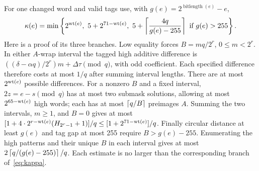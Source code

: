 For one changed word and valid tags use, with $g(e)=2^{\operatorname{bitlength}(e)}-e$,
\begin{equation}\label{eq:kappa}
 \kappa(e)=\min\left\{2^{\operatorname{wt}(e)},\ 5+2^{71-\operatorname{wt}(e)},\
 5+\left\lceil\frac{4q}{g(e)-255}\right\rceil\ \text{if }g(e)>255\right\}.
\end{equation}
Here is a proof of its three branches\cite{enhprior}. Low equality forces $B=mq/2^r$, $0\le m<2^r$. In either $A$-wrap interval the tagged high additive difference is $((\delta-\alpha q)/2^r)m+\Delta\tau\pmod q$, with odd coefficient. Each specified difference therefore costs at most $1/q$ after summing interval lengths. There are at most $2^{\operatorname{wt}(e)}$ possible differences. For a nonzero $B$ and a fixed interval, $2z=e-s\pmod q$ has at most two submask solutions, allowing at most $2^{65-\operatorname{wt}(e)}$ high words; each has at most $\left\lceil q/B\right\rceil$ preimages $A$. Summing the two intervals, $m\ge1$, and $B=0$ gives at most
$[1+4\cdot2^{r-\operatorname{wt}(e)}(H_{2^r-1}+1)]/q\le[1+2^{71-\operatorname{wt}(e)}]/q$.
Finally circular distance at least $g(e)$ and tag gap at most 255 require $B>g(e)-255$. Enumerating the high patterns and their unique $B$ in each interval gives at most $2\left\lceil q/(g(e)-255)\right\rceil/q$. Each estimate is no larger than the corresponding branch of~\eqref{eq:kappa}.

